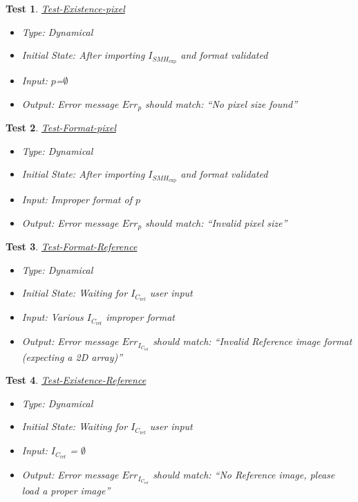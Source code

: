\documentclass[12pt, titlepage]{article}
\newtheorem{Test}{Test}
\begin{document}
\begin{Test}\normalfont\underline{Test-Existence-pixel}
\label{Test-Existence-pixel}
\begin{itemize}
\item Type: Dynamical
\item Initial State: After importing $I_{\mathit{SMH}_{\text{exp}}}$ and format validated
\item Input: $p$=$\emptyset$
\item Output: Error message $Err_{p}$ should match: \enquote{No pixel size found}
\end{itemize}
\end{Test}

\begin{Test}\normalfont\underline{Test-Format-pixel}
\label{Test-Format-pixel}
\begin{itemize}
\item Type: Dynamical
\item Initial State: After importing $I_{\mathit{SMH}_{\text{exp}}}$ and format validated
\item Input: Improper format of $p$
\item Output: Error message $Err_{p}$ should match: \enquote{Invalid pixel size}
\end{itemize}
\end{Test}

\begin{Test}\normalfont\underline{Test-Format-Reference}
\label{Test-Format-Reference}
\begin{itemize}
\item Type: Dynamical
\item Initial State: Waiting for $I_{C_{\text{ref}}}$ user input
\item Input: Various $I_{C_{\text{ref}}}$ improper format
\item Output: Error message $Err_{I_{C_{\text{ref}}}}$ should match: \enquote{Invalid Reference image format (expecting a 2D array)}
\end{itemize}
\end{Test}

\begin{Test}\normalfont\underline{Test-Existence-Reference}
\label{Test-Existence-Reference}
\begin{itemize}
\item Type: Dynamical
\item Initial State: Waiting for $I_{C_{\text{ref}}}$ user input
\item Input: $I_{C_{\text{ref}}}$ = $\emptyset$
\item Output: Error message $Err_{I_{C_{\text{ref}}}}$ should match: \enquote{No Reference image, please load a proper image}
\end{itemize}
\end{Test}
\end{document}
